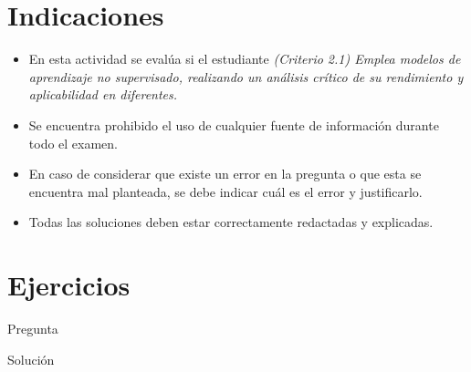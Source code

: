 \documentclass[11pt,a4]{aleph-examen}
\begin{document}
\encabezado

\section*{Indicaciones}
\begin{itemize}[leftmargin=*]
\item 
    En esta actividad se evalúa si el estudiante \textit{(Criterio 2.1) Emplea modelos de aprendizaje no supervisado, realizando un análisis crítico de su rendimiento y aplicabilidad en diferentes.} 
\item
    Se encuentra prohibido el uso de cualquier fuente de información durante todo el examen.
\item
    En caso de considerar que existe un error en la pregunta o que esta se encuentra mal planteada, se debe indicar cuál es el error y justificarlo.
\item
    Todas las soluciones deben estar correctamente redactadas y explicadas.
\end{itemize}

\section*{Ejercicios}

\begin{preguntas}

\item
    Pregunta

\begin{respuesta}
    Solución
\end{respuesta}


\end{preguntas}
\end{document}
